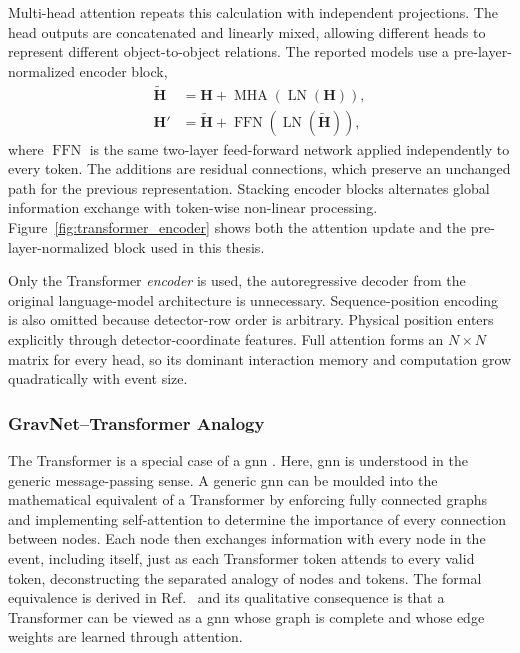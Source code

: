 Multi-head attention repeats this calculation with independent projections.
The head outputs are concatenated and linearly mixed, allowing different
heads to represent different object-to-object relations. The reported models
use a pre-layer-normalized encoder block,
\begin{align}
    \widetilde{\mathbf{H}}
    &=
    \mathbf{H}
    +
    \operatorname{MHA}\!\left(\operatorname{LN}(\mathbf{H})\right),
    \label{eq:preln_attention}\\
    \mathbf{H}'
    &=
    \widetilde{\mathbf{H}}
    +
    \operatorname{FFN}\!\left(
        \operatorname{LN}(\widetilde{\mathbf{H}})
    \right),
    \label{eq:preln_ffn}
\end{align}
where \(\operatorname{FFN}\) is the same two-layer feed-forward network
applied independently to every token. The additions are residual connections,
which preserve an unchanged path for the previous representation. Stacking
encoder blocks alternates global information exchange with token-wise
non-linear processing. Figure~\ref{fig:transformer_encoder} shows both the
attention update and the pre-layer-normalized block used in this thesis.



Only the Transformer \textit{encoder} is used, the autoregressive decoder from the
original language-model architecture \cite{vaswani2017attention} is unnecessary. Sequence-position
encoding is also omitted because detector-row order is arbitrary. Physical
position enters explicitly through detector-coordinate features. %
Full attention forms an
\(N\times N\) matrix for every head, so its dominant interaction memory and
computation grow quadratically with event size.













\subsubsection{GravNet--Transformer Analogy}
\label{sec:gravnet_transformer_comparison}

The Transformer is a special case of a \gls{gnn} \cite{joshi2025transformersgnn}. Here, \gls{gnn} is understood in the
generic message-passing sense. A generic
\gls{gnn} can be moulded into the mathematical equivalent of a Transformer by enforcing fully connected graphs and implementing self-attention to determine the importance
of every connection between nodes. Each node then exchanges information with every node in
the event, including itself, just as each Transformer token attends to every
valid token, deconstructing the separated analogy of nodes and tokens. The formal equivalence is derived in
Ref.~\cite{joshi2025transformersgnn} and its qualitative consequence is that a
Transformer can be viewed as a \gls{gnn} whose graph is complete and whose edge
weights are learned through attention.

